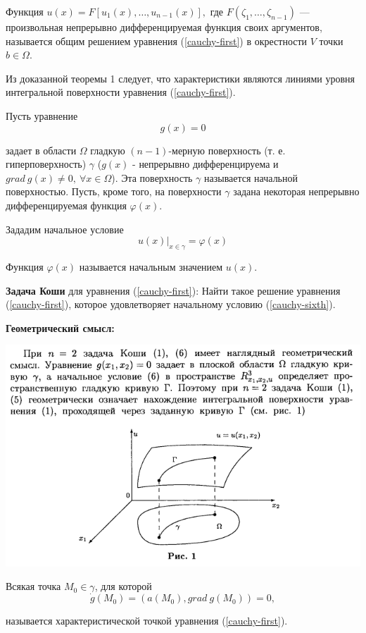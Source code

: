 \par \Def Функция $u(x)=F[u_1(x), \ldots, u_{n-1}(x)],$ где $F(\zeta_1, \ldots, \zeta_{n-1})$ — произвольная непрерывно дифференцируемая функция своих аргументов, называется общим решением уравнения (\ref{cauchy-first}) в окрестности $V$ точки $b \in \Omega$.

\par \Note Из доказанной теоремы 1 следует, что характеристики являются линиями уровня интегральной поверхности уравнения (\ref{cauchy-first}).

\par Пусть уравнение
$$g(x)=0$$
\par задает в области $\Omega$ гладкую $(n-1)$-мерную поверхность (т. е. гиперповерхность) $\gamma$ ($g(x)$ - непрерывно дифференцируема и $grad \: g(x) \neq 0,\: \forall x \in \Omega$).
Эта поверхность $\gamma$ называется начальной поверхностью. Пусть, кроме того, на поверхности $\gamma$ задана некоторая непрерывно дифференцируемая функция $\varphi(x)$.

\par Зададим начальное условие
\begin{equation}\label{cauchy-sixth}
    u(x)|_{x\in \gamma}=\varphi(x)
\end{equation}
\par Функция $\varphi(x)$ называется начальным значением $u(x)$.

\par \textbf{Задача Коши} для уравнения (\ref{cauchy-first}): Найти такое решение уравнения (\ref{cauchy-first}), которое удовлетворяет начальному условию (\ref{cauchy-sixth}).
\par \textbf{Геометрический смысл:}
\begin{center}
    \includegraphics[scale=1.1]{sections/Dima/images/cauchy.png}
\end{center}
\par \Def Всякая точка $M_0 \in \gamma$, для которой
$$\dot{g}(M_0)=(a(M_0), grad \: g(M_0))=0,$$
\par называется характеристической точкой уравнения (\ref{cauchy-first}).

